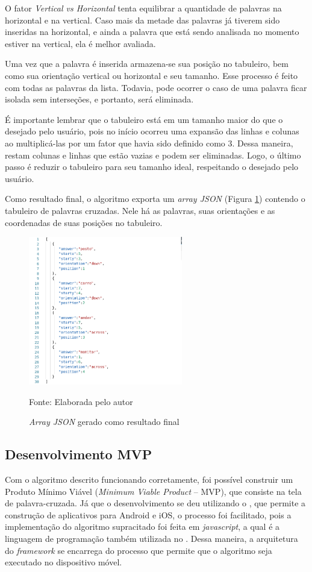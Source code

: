 O fator \textit{Vertical vs Horizontal} tenta equilibrar a quantidade de palavras na horizontal e na vertical. Caso mais da metade das palavras já tiverem sido inseridas na horizontal, e ainda a palavra que está sendo analisada no momento estiver na vertical, ela é melhor avaliada.

Uma vez que a palavra é inserida armazena-se sua posição no tabuleiro, bem como sua orientação vertical ou horizontal e seu tamanho. Esse processo é feito com todas as palavras da lista. Todavia, pode ocorrer o caso de uma palavra ficar isolada sem interseções, e portanto, será eliminada. 

É importante lembrar que o tabuleiro está em um tamanho maior do que o desejado pelo usuário, pois no início ocorreu uma expansão das linhas e colunas ao multiplicá-las por um fator que havia sido definido como 3. Dessa maneira, restam colunas e linhas que estão vazias e podem ser eliminadas. Logo, o último passo é reduzir o tabuleiro para seu tamanho ideal, respeitando o desejado pelo usuário. 

Como resultado final, o algoritmo exporta um \textit{array JSON} (Figura \ref{fig:json}) contendo o tabuleiro de palavras cruzadas. Nele há as palavras, suas orientações e as coordenadas de suas posições no tabuleiro.

\begin{figure}[H]
\centering
    \caption{\textit{Array JSON} gerado como resultado final}
    \label{fig:json}
    \includegraphics[width=0.6\textwidth]{Figuras/codeJSONresult.png}
    
    Fonte: Elaborada pelo autor
\end{figure}

\subsection{Desenvolvimento MVP}
Com o algoritmo descrito funcionando corretamente, foi possível construir um Produto Mínimo Viável (\textit{Minimum Viable Product} -- MVP), que consiste na tela de palavra-cruzada. Já que o desenvolvimento se deu utilizando o \cite{RN}, que permite a construção de aplicativos para Android e iOS, o processo foi facilitado, pois a implementação do algoritmo supracitado foi feita em \textit{javascript}, a qual é a linguagem de programação também utilizada no \cite{RN}. Dessa maneira, a arquitetura do \textit{framework} se encarrega do processo que permite que o algoritmo seja executado no dispositivo móvel.

